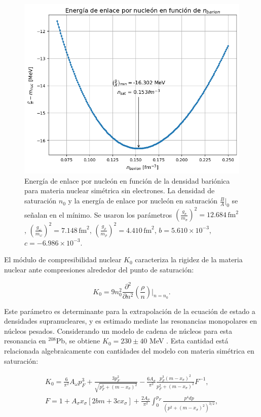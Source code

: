 \begin{figure}[h]
	\centering
	\includegraphics[width=0.7\linewidth]{Figuras/saturacion_base}
	\caption[Energía de enlace por nucleón en saturación nuclear]{Energía de enlace por nucleón en función de la densidad bariónica para materia nuclear simétrica sin electrones. La densidad de saturación $n_0$ y la energía de enlace por nucleón en saturación $\frac{B}{A}\big|_0$ se señalan en el mínimo. Se usaron los parámetros $\left(\frac{g_\sigma}{m_\sigma}\right)^2=12.684\,\text{fm}^2$, $\left(\frac{g_\omega}{m_\omega}\right)^2=7.148\,\text{fm}^2$, $\left(\frac{g_\rho}{m_\rho}\right)^2=4.410\,\text{fm}^2$, $b=5.610\times10^{-3}$, $c=-6.986\times10^{-3}$.}
	\label{fig:saturacionbase}
\end{figure}

El módulo de compresibilidad nuclear $K_0$ caracteriza la rigidez de la materia nuclear ante compresiones alrededor del punto de saturación:

\begin{equation*}
	K_0 = 9n_0^2 \frac{\partial^2}{\partial n^2}\left(\frac{\rho}{n}\right)\bigg|_{n=n_0}.
\end{equation*}

Este parámetro es determinante para la extrapolación de la ecuación de estado a densidades supranucleares, y es estimado mediate las resonancias monopolares en núcleos pesados. Considerando un modelo de cadena de núcleos para esta resonancia en $^{208}$Pb, se obtiene $K_0 = 230 \pm 40$ MeV \cite{kumarTheoreticalExperimentalConstraints2024, khanConstrainingNuclearEquation2012}. Esta cantidad está relacionada algebraicamente con cantidades del modelo con materia simétrica en saturación:

\begin{equation}
	\begin{gathered}
		K_0 = \frac{6}{\pi^2}A_\omega p_F^3 + \frac{3p_F^2}{\sqrt{p_F^2 + (m-x_\sigma)^2}} - \frac{6A_\sigma}{\pi^2}\frac{p_F^3(m-x_\sigma)^2}{p_F^2+(m-x_\sigma)^2}F^{-1}, \\
		F = 1 + A_\sigma x_\sigma[2bm+3cx_\sigma]+\frac{2A_\sigma}{\pi^2}\int_0^{p_F} \frac{p^4 dp}{(p^2+(m-x_\sigma)^2)^{3/2}},
	\end{gathered}
	\label{eq:modulo_compresibilidad}
\end{equation}

